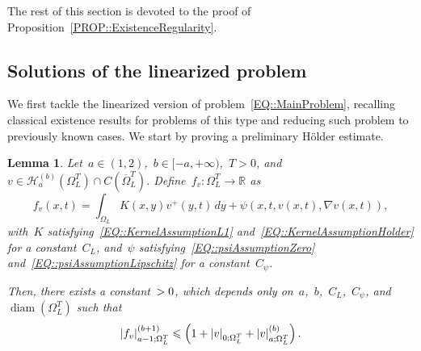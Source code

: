 \documentclass[12pt,a4paper]{amsart}
\makeatletter
\numberwithin{equation}{section}
\newtheorem{lemma}[theorem]{Lemma}
\theoremstyle{definition}
\theoremstyle{remark}
\newcommand{\R}{\mathbb{R}}
\newcommand{\abs}[1]{\left\lvert#1\right\rvert}
\renewcommand{\leq}{\leqslant}
\newcommand{\const}[1]{%
  \csname const@#1\endcsname%
}
\makeatother
\begin{document}
The rest of this section is devoted to the proof of Proposition~\ref{PROP::ExistenceRegularity}.

\subsection{Solutions of the linearized problem}
We first tackle the linearized version of problem~\eqref{EQ::MainProblem}, recalling classical existence results for problems of this type and reducing such problem to previously known cases. We start by proving a preliminary Hölder estimate.

\begin{lemma}\label{LEM::ForcingTermCalphaBound}
    Let~$a \in (1,2)$,~$b \in [-a,+\infty)$,~$T>0$, and~$v \in \mathcal{H}_{a}^{(b)}(\Omega_L^T) \cap C(\overline{\Omega}_L^T)$. Define~$f_v \colon \Omega_L^T \to \R$ as %
    \begin{equation}
        f_v(x,t) = \int_{\Omega_L} K(x,y)v^+(y,t)\,dy + \psi\left(x,t,v(x,t),\nabla v(x,t)\right),
    \end{equation}
    with~$K$ satisfying~\eqref{EQ::KernelAssumptionL1} and~\eqref{EQ::KernelAssumptionHolder} for a constant~$C_L$, and~$\psi$ satisfying~\eqref{EQ::psiAssumptionZero} and~\eqref{EQ::psiAssumptionLipschitz} for a constant~$C_\psi$. 
    
    Then, there exists a constant~$\const{CONST::ForcingTermCalphaBound} > 0$, which depends only on~$a$,~$b$,~$C_L$,~$C_\psi$, and~$\operatorname{diam}(\Omega_L^T)$ such that
    \begin{equation}\label{EQ::ForcingTermCalphaBound}
        \abs{f_v}_{a-1;\Omega^T_L}^{(b+1)} \leq \const{CONST::ForcingTermCalphaBound} \left(1+\abs{v}_{0;\Omega_L^T}+\abs{v}_{{a; \Omega_L^T}}^{(b)}\right).
    \end{equation}
\end{lemma}
\end{document}
